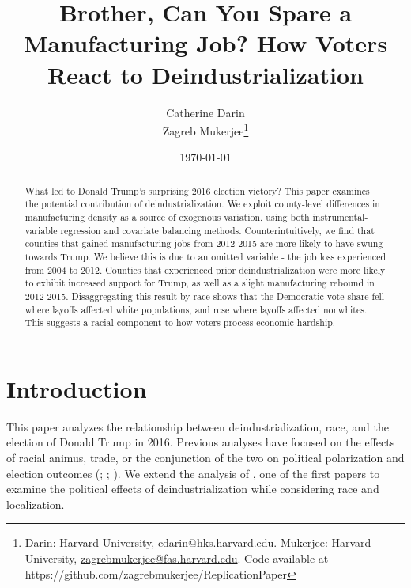 \documentclass[]{AEA}
\begin{document}
\title{Brother, Can You Spare a Manufacturing Job? How Voters React to
Deindustrialization}


\author{
  Catherine Darin\\
  Zagreb Mukerjee\thanks{
  Darin: Harvard
University, \href{mailto:cdarin@hks.harvard.edu}{cdarin@hks.harvard.edu}.
  Mukerjee: Harvard
University, \href{mailto:zagrebmukerjee@fas.harvard.edu}{zagrebmukerjee@fas.harvard.edu}.
  Code available at https://github.com/zagrebmukerjee/ReplicationPaper
}
}

\date{\today}
\pubVolume{}
\pubIssue{}
\JEL{}
\Keywords{}

\begin{abstract}
What led to Donald Trump's surprising 2016 election victory? This paper
examines the potential contribution of deindustrialization. We exploit
county-level differences in manufacturing density as a source of
exogenous variation, using both instrumental-variable regression and
covariate balancing methods. Counterintuitively, we find that counties
that gained manufacturing jobs from 2012-2015 are more likely to have
swung towards Trump. We believe this is due to an omitted variable - the
job loss experienced from 2004 to 2012. Counties that experienced prior
deindustrialization were more likely to exhibit increased support for
Trump, as well as a slight manufacturing rebound in 2012-2015.
Disaggregating this result by race shows that the Democratic vote share
fell where layoffs affected white populations, and rose where layoffs
affected nonwhites. This suggests a racial component to how voters
process economic hardship.
\end{abstract}


\maketitle

\section{Introduction} 
\label{Introduction}

This paper analyzes the relationship between deindustrialization, race,
and the election of Donald Trump in 2016. Previous analyses have focused
on the effects of racial animus, trade, or the conjunction of the two on
political polarization and election outcomes (\cite{Autor20};
\cite{Che16}; \cite{BR21}). We extend the analysis of \cite{Baccini21},
one of the first papers to examine the political effects of
deindustrialization while considering race and localization.
\end{document}
